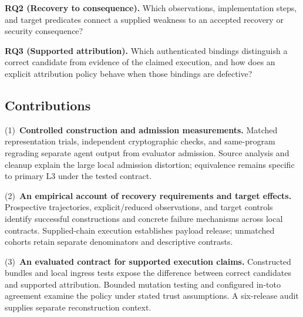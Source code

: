 \textbf{RQ2 (Recovery to consequence).} Which observations, implementation
steps, and target predicates connect a supplied weakness to an accepted
recovery or security consequence?

\textbf{RQ3 (Supported attribution).} Which authenticated bindings distinguish
a correct candidate from evidence of the claimed execution, and how does an
explicit attribution policy behave when those bindings are defective?

\subsection{Contributions}
(1)~\textbf{Controlled construction and admission measurements.}
Matched representation trials, independent cryptographic checks, and
same-program regrading separate agent output from evaluator admission.
Source analysis and cleanup explain the large local admission distortion;
equivalence remains specific to primary L3 under the tested contract.

(2)~\textbf{An empirical account of recovery requirements and target effects.}
Prospective trajectories, explicit/reduced observations, and target controls
identify successful constructions and concrete failure mechanisms across
local contracts. Supplied-chain execution establishes payload release;
unmatched cohorts retain separate denominators and descriptive contrasts.

(3)~\textbf{An evaluated contract for supported execution claims.}
Constructed bundles and local ingress tests expose the difference between
correct candidates and supported attribution. Bounded mutation testing and
configured in-toto agreement examine the policy under stated trust
assumptions. A six-release audit supplies separate reconstruction context.
